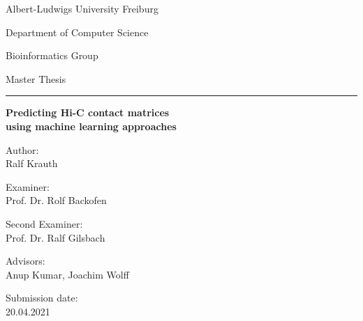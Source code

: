 \begin{titlepage}
 \centering
 Albert-Ludwigs University Freiburg
 
 Department of Computer Science
 
 Bioinformatics Group
 \vspace{4cm}
 
  Master Thesis
 \vspace{3mm} 
  
 \huge \hrule \vspace{5mm}
 \textbf{Predicting Hi-C contact matrices \\ using machine learning approaches}
 
 \hrulefill
 
 \vfill
 \raggedright
 \normalsize
  Author:\\
  Ralf Krauth 
  
  Examiner:\\
  Prof. Dr. Rolf Backofen
  
  Second Examiner:\\
  Prof. Dr. Ralf Gilsbach
  
  Advisors:\\
  Anup Kumar, Joachim Wolff
  
  Submission date:\\
  20.04.2021

\end{titlepage}
